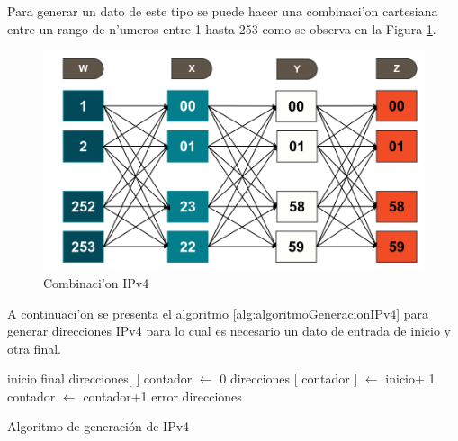 Para generar un dato de este tipo se puede hacer una combinaci'on cartesiana entre un rango de n'umeros entre 1 hasta 253 como se observa en la Figura \ref{fig:algoritmoGeneracionIPv4}.

\begin{figure}[H]
\centering
\includegraphics[scale=0.45]{images/ipv4.png}
\caption{Combinaci'on IPv4} \label{fig:algoritmoGeneracionIPv4}
\end{figure}

A continuaci'on se presenta el algoritmo \ref{alg:algoritmoGeneracionIPv4} para generar direcciones IPv4 para lo cual es necesario un dato de entrada de inicio y otra final.
\begin{algorithm}[H]
\begin{algorithmic}[1]
\REQUIRE inicio final
\STATE direcciones$[$ $]$
\STATE contador $\leftarrow$ 0
	\STATE direcciones $[$ contador $]$ $\leftarrow$ inicio+ 1
	\STATE contador $\leftarrow$ contador+1
	\ENDWHILE
\ELSE
	\RETURN error
\ENDIF
\RETURN direcciones
\end{algorithmic}
\caption{Algoritmo de generaci\'on de IPv4}\label{alg:algoritmoGeneracionIPv4}
\end{algorithm}